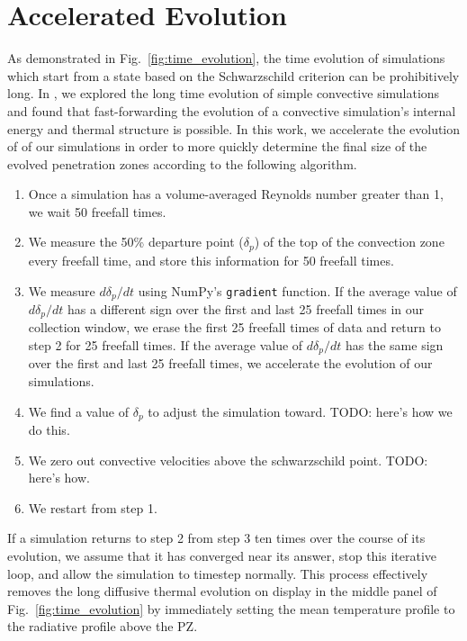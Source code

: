 \documentclass{aastex631}
\begin{document}
\appendix

\section{Accelerated Evolution}
\label{app:accelerated_evolution}
As demonstrated in Fig.~\ref{fig:time_evolution}, the time evolution of simulations which start from a state based on the Schwarzschild criterion can be prohibitively long.
In \citet{anders_etal_2018}, we explored the long time evolution of simple convective simulations and found that fast-forwarding the evolution of a convective simulation's internal energy and thermal structure is possible.
In this work, we accelerate the evolution of of our simulations in order to more quickly determine the final size of the evolved penetration zones according to the following algorithm.
\begin{enumerate}
\item Once a simulation has a volume-averaged Reynolds number greater than 1, we wait 50 freefall times.
\item We measure the 50\% departure point ($\delta_p$) of the top of the convection zone every freefall time, and store this information for 50 freefall times.
\item We measure $d\delta_p/dt$ using NumPy's \texttt{gradient} function. 
If the average value of $d\delta_p/dt$ has a different sign over the first and last 25 freefall times in our collection window, we erase the first 25 freefall times of data and return to step 2 for 25 freefall times.
If the average value of $d\delta_p/dt$ has the same sign over the first and last 25 freefall times, we accelerate the evolution of our simulations.
\item We find a value of $\delta_p$ to adjust the simulation toward. TODO: here's how we do this.
\item We zero out convective velocities above the schwarzschild point. TODO: here's how.
\item We restart from step 1.
\end{enumerate}
If a simulation returns to step 2 from step 3 ten times over the course of its evolution, we assume that it has converged near its answer, stop this iterative loop, and allow the simulation to timestep normally.
This process effectively removes the long diffusive thermal evolution on display in the middle panel of Fig.~\ref{fig:time_evolution} by immediately setting the mean temperature profile to the radiative profile above the PZ.
\end{document}
